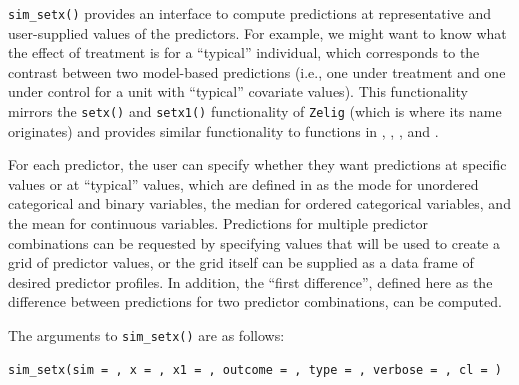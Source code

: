 \texttt{sim\_setx()} provides an interface to compute predictions at representative and user-supplied values of the predictors. For example, we might want to know what the effect of treatment is for a ``typical'' individual, which corresponds to the contrast between two model-based predictions (i.e., one under treatment and one under control for a unit with ``typical'' covariate values). This functionality mirrors the \texttt{setx()} and \texttt{setx1()} functionality of \texttt{Zelig} (which is where its name originates) and provides similar functionality to functions in , , , and .

For each predictor, the user can specify whether they want predictions at specific values or at ``typical'' values, which are defined in  as the mode for unordered categorical and binary variables, the median for ordered categorical variables, and the mean for continuous variables. Predictions for multiple predictor combinations can be requested by specifying values that will be used to create a grid of predictor values, or the grid itself can be supplied as a data frame of desired predictor profiles. In addition, the ``first difference'', defined here as the difference between predictions for two predictor combinations, can be computed.

The arguments to \texttt{sim\_setx()} are as follows:

\begin{verbatim}
sim_setx(sim = , x = , x1 = , outcome = , type = , verbose = , cl = )
\end{verbatim}


